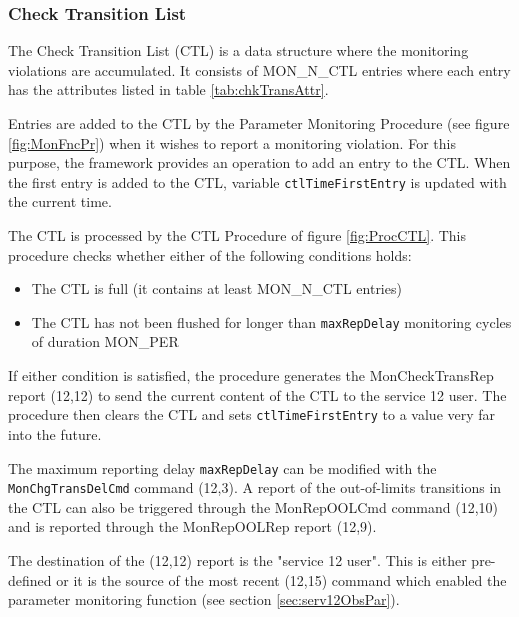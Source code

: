 \documentclass{pnp_article}
\begin{document}
\subsubsection{Check Transition List}\label{sec:ChkTransList}
The Check Transition List (CTL) is a data structure where the monitoring violations are accumulated. It consists of MON\_N\_CTL entries where each entry has the attributes listed in table \ref{tab:chkTransAttr}.

Entries are added to the CTL by the Parameter Monitoring Procedure (see figure \ref{fig:MonFncPr}) when it wishes to report a monitoring violation. For this purpose, the framework provides an operation to add an entry to the CTL. When the first entry is added to the CTL, variable \texttt{ctlTimeFirstEntry} is updated with the current time.

The CTL is processed by the CTL Procedure of figure \ref{fig:ProcCTL}. This procedure checks whether either of the following conditions holds:

\begin{itemize}
\item The CTL is full (it contains at least MON\_N\_CTL entries)
\item The CTL has not been flushed for longer than \texttt{maxRepDelay} monitoring cycles of duration MON\_PER
\end{itemize}
 
If either condition is satisfied, the procedure generates the MonCheckTransRep report (12,12) to send the current content of the CTL to the service 12 user. The procedure then clears the CTL and sets \texttt{ctlTimeFirstEntry} to a value very far into the future.

The maximum reporting delay \texttt{maxRepDelay} can be modified with the \texttt{MonChgTransDelCmd} command (12,3). A report of the out-of-limits transitions in the CTL can also be triggered through the MonRepOOLCmd command (12,10) and is reported through the MonRepOOLRep report (12,9). 

The destination of the (12,12) report is the "service 12 user". This is either pre-defined or it is the source of the most recent (12,15) command which enabled the parameter monitoring function (see section \ref{sec:serv12ObsPar}).
\end{document}
